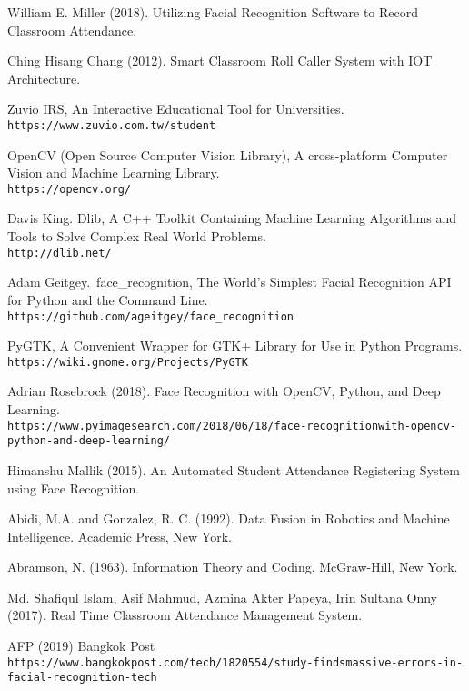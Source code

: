 \begin{thebibliography}{10}

  William E. Miller (2018).
  Utilizing Facial Recognition Software to Record Classroom Attendance.

  Ching Hisang Chang (2012).
  Smart Classroom Roll Caller System with IOT Architecture.

  Zuvio IRS,
  An Interactive Educational Tool for Universities.
  \\\texttt{https://www.zuvio.com.tw/student}

  OpenCV (Open Source Computer Vision Library),
  A cross-platform Computer Vision and Machine Learning Library.
  \\\texttt{https://opencv.org/}

  Davis King.
  Dlib,
  A C++ Toolkit Containing Machine Learning Algorithms and Tools to Solve Complex Real World Problems.
  \\\texttt{http://dlib.net/}

  Adam Geitgey.\
  face\_recognition,
  The World's Simplest Facial Recognition API for Python and the Command Line.
  \\\texttt{https://github.com/ageitgey/face\_recognition}

  PyGTK,
  A Convenient Wrapper for GTK+ Library for Use in Python Programs.
  \\\texttt{https://wiki.gnome.org/Projects/PyGTK}

  Adrian Rosebrock (2018).
  Face Recognition with OpenCV, Python, and Deep Learning.
  \\\texttt{https://www.pyimagesearch.com/2018/06/18/face-recognition\-with-opencv-python-and-deep-learning/}

  Himanshu Mallik (2015).
  An Automated Student Attendance Registering System using Face Recognition.

  Abidi, M.A. and Gonzalez, R. C. (1992).
  Data Fusion in Robotics and Machine Intelligence.
  Academic Press, New York.

  Abramson, N. (1963).
  Information Theory and Coding.
  McGraw-Hill, New York.

  Md. Shafiqul Islam, Asif Mahmud, Azmina Akter Papeya, Irin Sultana Onny (2017).
  Real Time Classroom Attendance Management System.

  AFP (2019)
  Bangkok Post
  \\\texttt{https://www.bangkokpost.com/tech/1820554/study-finds\-massive-errors-in-facial-recognition-tech}

\end{thebibliography}
